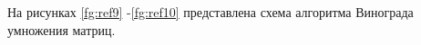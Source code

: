 \documentclass[12pt]{report}
\begin{document}
На рисунках \ref{fg:ref9} -\ref{fg:ref10} представлена схема алгоритма Винограда умножения матриц.

\begin{figure}[ht!]
\end{figure}
\end{document}
